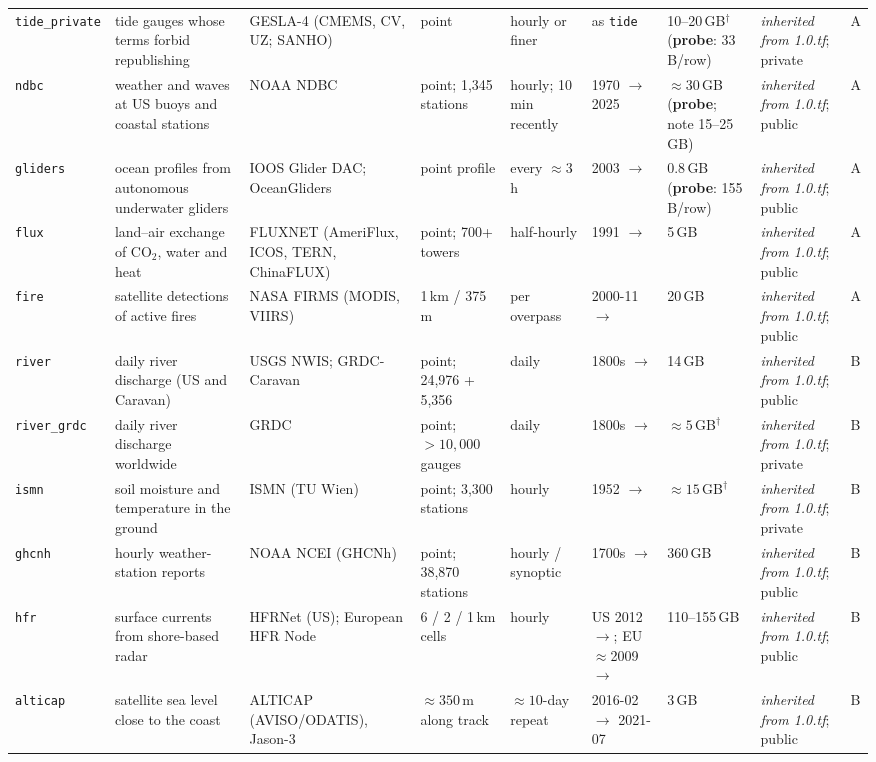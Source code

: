 \documentclass[10pt]{article}
\newcommand{\code}[1]{\texttt{#1}}
\begin{document}
{\begin{longtable}{@{}L{1.65cm}L{2.6cm}L{2.0cm}L{1.7cm}L{1.75cm}L{1.85cm}L{2.5cm}L{2.1cm}L{0.5cm}@{}}
\code{tide\_private} & tide gauges whose terms forbid republishing & GESLA-4 (CMEMS, CV, UZ; SANHO) & point & hourly or finer & as \code{tide} & 10--20\,GB$^\dagger$ (\textbf{probe}: 33\,B/row) & \emph{inherited from 1.0.tf}; private & A \\
\code{ndbc} & weather and waves at US buoys and coastal stations & NOAA NDBC & point; 1,345 stations & hourly; 10\,min recently & 1970 $\to$ 2025 & $\approx 30$\,GB (\textbf{probe}; note 15--25\,GB) & \emph{inherited from 1.0.tf}; public & A \\
\code{gliders} & ocean profiles from autonomous underwater gliders & IOOS Glider DAC; OceanGliders & point profile & every $\approx 3$\,h & 2003 $\to$ & 0.8\,GB (\textbf{probe}: 155\,B/row) & \emph{inherited from 1.0.tf}; public & A \\
\code{flux} & land--air exchange of CO$_2$, water and heat & FLUXNET (AmeriFlux, ICOS, TERN, ChinaFLUX) & point; 700+ towers & half-hourly & 1991 $\to$ & 5\,GB & \emph{inherited from 1.0.tf}; public & A \\
\code{fire} & satellite detections of active fires & NASA FIRMS (MODIS, VIIRS) & 1\,km / 375\,m & per overpass & 2000-11 $\to$ & 20\,GB & \emph{inherited from 1.0.tf}; public & A \\
\code{river} & daily river discharge (US and Caravan) & USGS NWIS; GRDC-Caravan & point; 24,976 + 5,356 & daily & 1800s $\to$ & 14\,GB & \emph{inherited from 1.0.tf}; public & B \\
\code{river\_grdc} & daily river discharge worldwide & GRDC & point; $>10{,}000$ gauges & daily & 1800s $\to$ & $\approx 5$\,GB$^\dagger$ & \emph{inherited from 1.0.tf}; private & B \\
\code{ismn} & soil moisture and temperature in the ground & ISMN (TU Wien) & point; 3,300 stations & hourly & 1952 $\to$ & $\approx 15$\,GB$^\dagger$ & \emph{inherited from 1.0.tf}; private & B \\
\code{ghcnh} & hourly weather-station reports & NOAA NCEI (GHCNh) & point; 38,870 stations & hourly / synoptic & 1700s $\to$ & 360\,GB & \emph{inherited from 1.0.tf}; public & B \\
\code{hfr} & surface currents from shore-based radar & HFRNet (US); European HFR Node & 6 / 2 / 1\,km cells & hourly & US 2012 $\to$; EU $\approx$2009 $\to$ & 110--155\,GB & \emph{inherited from 1.0.tf}; public & B \\
\code{alticap} & satellite sea level close to the coast & ALTICAP (AVISO/ODATIS), Jason-3 & $\approx 350$\,m along track & $\approx 10$-day repeat & 2016-02 $\to$ 2021-07 & 3\,GB & \emph{inherited from 1.0.tf}; public & B \\

\end{longtable}}
\end{document}
